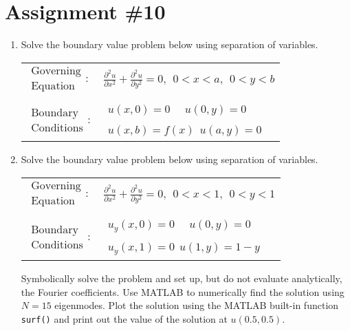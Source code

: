 \chapter{Assignment \#10}
\label{ch:ass10}
\begin{fullwidth}

\begin{enumerate}
\item Solve the boundary value problem below using separation of variables.
\begin{table}[h]
\begin{tabular}{l l}
$\substack{\text{Governing} \\\text{Equation}}: $& $\frac{\partial^2 u}{\partial x^2} + \frac{\partial^2 u}{\partial y^2} = 0, \ \ 0<x<a, \ \ 0<y<b $\\
& \\
$\substack{\text{Boundary} \\ \text{Conditions}}: $ & $\substack{u(x,0)=0  \ \ \ \ \ \ u(0,y) = 0 \\ \\ u(x,b) = f(x) \ \ u(a,y) = 0}$ 
\end{tabular}
\end{table} 


\vspace{2.0cm}

\item Solve the boundary value problem below using separation of variables.
\begin{table}[h]
\begin{tabular}{l l}
$\substack{\text{Governing} \\\text{Equation}}: $& $\frac{\partial^2 u}{\partial x^2} + \frac{\partial^2 u}{\partial y^2} = 0, \ \ 0<x<1, \ \ 0<y<1 $\\
& \\
$\substack{\text{Boundary} \\ \text{Conditions}}: $ & $\substack{u_y(x,0)=0  \ \ \ \ \ \ u(0,y) = 0 \\ \\ u_y(x,1) = 0 \ \ u(1,y) = 1-y}$ 
\end{tabular}
\end{table} 

\noindent Symbolically solve the problem and set up, but do not evaluate analytically, the Fourier coefficients.  Use MATLAB to numerically find the solution using $N=15$ eigenmodes.  Plot the solution using the MATLAB built-in function \lstinline[style=myMatlab]{surf()} and print out the value of the solution at $u(0.5,0.5)$.


\end{enumerate}
\end{fullwidth}

